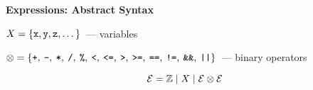 \centering

\textbf{Expressions: Abstract Syntax}
\vskip1cm

$X=\{\cd{x}, \cd{y}, \cd{z}, \dots\}$~--- variables
\vskip 7mm

$\otimes=\{\cd{+},\:\cd{-},\:\cd{*},\:\cd{/},\:\cd{\%},\:\cd{<},\:\cd{<=},\:\cd{>},\:\cd{>=},\:\cd{==},\:\cd{!=},\:\cd{\&\&},\:\cd{||}\}$~--- binary operators

$$
{\cal E}=\ZZ\mid X \mid {\cal E}\otimes{\cal E}
$$

